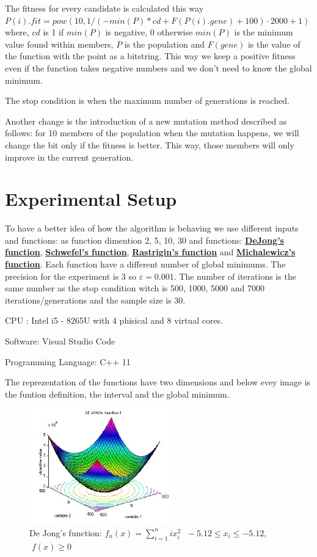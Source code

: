 \documentclass[12pt,leqno]{article}
\begin{document}
  The fitness for every candidate is calculated this way $ P(i).fit = pow(10 , 1 / ( - min(P) * cd + F(P(i).gene) + 100) \cdot 2000 + 1) $ where, $ cd $ is 1 if $ min(P) $ 
  is negative, 0 otherwise $min(P)$ is the minimum value found within members, $P$ is the population and $F(gene)$ is the value of the function with the point as a bitstring. 
  This way we keep a positive fitness even if the function takes negative numbers and we don't need to know the global minimum.
  
  The stop condition is when the maximum number of generations is reached.

  Another change is the introduction of a new mutation method described as follows: for 10 members of the population when the mutation happens, 
  we will change the bit only if the fitness is better. This way, those members will only improve in the current generation.


\section{Experimental Setup}
  To have a better idea of how the algorithm is behaving we use different inputs and functions: as function dimention 2, 5, 10, 30 and functions: \href{http://www.geatbx.com/docu/fcnindex-01.html#P89_3085}{\textbf{DeJong's function}}, \href{http://www.geatbx.com/docu/fcnindex-01.html#P150_6749}{\textbf{Schwefel's function}},
  \href{http://www.geatbx.com/docu/fcnindex-01.html#P140_6155}{\textbf{Rastrigin's function}} and \href{http://www.geatbx.com/docu/fcnindex-01.html#P204_10395}{\textbf{Michalewicz's function}}. 
  Each function have a different number of global minimums. The precision for the experiment is 3 so $ \varepsilon = 0.001 $.
  The number of iterations is the same number as the stop condition witch is 500, 1000, 5000 and 7000 iterations/generations and the sample size is 30.

  CPU : Intel i5 - 8265U with 4 phisical and 8 virtual cores.

  Software: Visual Studio Code

  Programming Language: C++ 11

  The reprezentation of the functions have two dimensions and below evey image is the funtion definition, the interval and the global minimum.
  
  \begin{figure}[bp!]
    \centering
    \includegraphics[width=0.4\linewidth, height=5cm]{dejong.jpg} 
    \caption*{De Jong's function: $ f_n(x) = \sum_{i=1}^{n} i x_i^2 $ $\; -5.12 \leq x_i \leq -5.12 $, $\; f(x) \geq 0 $}
  \end{figure}
  
\end{document}
